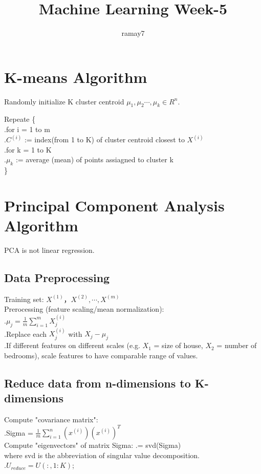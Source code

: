 \documentclass[11pt]{article}
\begin{document}
	\title{Machine Learning Week-5}
	\author{ramay7}
	
	\maketitle %
	\tableofcontents %
	
	\section{K-means Algorithm}
		Randomly initialize K cluster centroid $\mu_1, \mu_2\cdots, \mu_k \in R^{n}$.
		
		Repeate \{ \\
		.\qquad	for i = 1 to m\\
		.\qquad \qquad $C^{(i)}$ := index(from 1 to K) of cluster centroid closest to $X^{(i)}$ \\
		.\qquad for k = 1 to K\\
		.\qquad \qquad $\mu_k$ := average (mean) of points assiagned to cluster k\\
		\} \\
	\section{Principal Component Analysis Algorithm}
		PCA is not linear regression.
		\subsection{Data Preprocessing}
			Training set: $X^{(1)}， X^{(2)}, \cdots, X^{(m)}$ \\
			Prerocessing (feature scaling/mean normalization):\\
			.\qquad $\mu_j = \frac{1}{m}\sum_{i=1}^{m}X_{j}^{(i)}$ \\
			.\qquad Replace each $X_{j}^{(i)}$ with $X_j - \mu_j$ \\
			.\qquad If different features on different scales (e.g. $X_1$ = size of house, $X_2$ = number of bedrooms), scale features to have comparable range of values.
		\subsection{Reduce data from n-dimensions to K-dimensions}
			Compute "covariance matrix":\\
			.\qquad Sigma = $\frac{1}{m}\sum_{i=1}^{n}(x^{(i)})(x^{(i)})^{T}$\\
			Compute "eigenvectors" of matrix Sigma:
			.\qquad [U, S, V] = svd(Sigma)\\
			where svd is the abbreviation of singular value decomposition.\\
			.\qquad $ U_{reduce} = U(:, 1:K) $;
\end{document}
